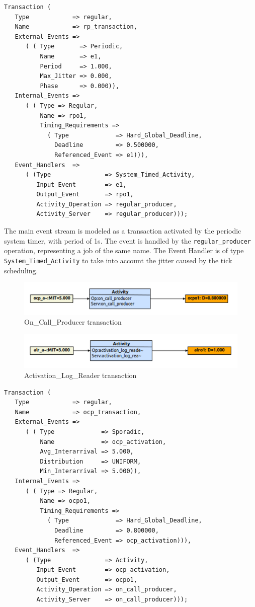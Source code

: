 \documentclass{article}
\begin{document}
\begin{lstlisting}
Transaction (
   Type            => regular,
   Name            => rp_transaction,
   External_Events =>
      ( ( Type       => Periodic,
          Name       => e1,
          Period     => 1.000,
          Max_Jitter => 0.000,
          Phase      => 0.000)),
   Internal_Events =>
      ( ( Type => Regular,
          Name => rpo1,
          Timing_Requirements =>
            ( Type             => Hard_Global_Deadline,
              Deadline         => 0.500000,
              Referenced_Event => e1))),
   Event_Handlers  =>
      ( (Type               => System_Timed_Activity,
         Input_Event        => e1,
         Output_Event       => rpo1,
         Activity_Operation => regular_producer,
         Activity_Server    => regular_producer)));
\end{lstlisting}

The main event stream is modeled as a transaction activated by the periodic system timer, with period of 1s. The event is handled by the \texttt{regular\_producer} operation, representing a job of the same name. The Event Handler is of type \texttt{System\_Timed\_Activity} to take into account the jitter caused by the tick scheduling.

\begin{figure}[!htbp]
\centering
\includegraphics[width=5in]{images/transaction-ocp}
\caption{On\_Call\_Producer transaction}
\label{transaction-ocp}
\end{figure}

\begin{figure}[!htbp]
\centering
\includegraphics[width=5in]{images/transaction-alr}
\caption{Activation\_Log\_Reader transaction}
\label{transaction-alr}
\end{figure}

\begin{lstlisting}
Transaction (
   Type            => regular,
   Name            => ocp_transaction,
   External_Events =>
      ( ( Type             => Sporadic,
          Name             => ocp_activation,
          Avg_Interarrival => 5.000,
          Distribution     => UNIFORM,
          Min_Interarrival => 5.000)),
   Internal_Events =>
      ( ( Type => Regular,
          Name => ocpo1,
          Timing_Requirements =>
            ( Type             => Hard_Global_Deadline,
              Deadline         => 0.800000,
              Referenced_Event => ocp_activation))),
   Event_Handlers  =>
      ( (Type               => Activity,
         Input_Event        => ocp_activation,
         Output_Event       => ocpo1,
         Activity_Operation => on_call_producer,
         Activity_Server    => on_call_producer)));
\end{lstlisting}
\end{document}

